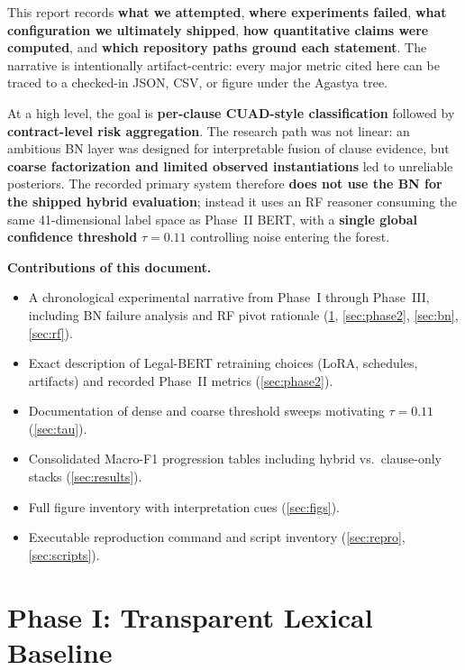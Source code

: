 \documentclass[conference,twocolumn]{IEEEtran}
\begin{document}
This report records \textbf{what we attempted}, \textbf{where experiments failed}, \textbf{what configuration we ultimately shipped}, \textbf{how quantitative claims were computed}, and \textbf{which repository paths ground each statement}. The narrative is intentionally artifact-centric: every major metric cited here can be traced to a checked-in JSON, CSV, or figure under the Agastya tree.

At a high level, the goal is \textbf{per-clause CUAD-style classification} followed by \textbf{contract-level risk aggregation}. The research path was not linear: an ambitious BN layer was designed for interpretable fusion of clause evidence, but \textbf{coarse factorization and limited observed instantiations} led to unreliable posteriors. The recorded primary system therefore \textbf{does not use the BN for the shipped hybrid evaluation}; instead it uses an RF reasoner consuming the same 41-dimensional label space as Phase~II BERT, with a \textbf{single global confidence threshold} $\tau = 0.11$ controlling noise entering the forest.

\textbf{Contributions of this document.}
\begin{itemize}
  \item A chronological experimental narrative from Phase~I through Phase~III, including BN failure analysis and RF pivot rationale (\ref{sec:phase1}, \ref{sec:phase2}, \ref{sec:bn}, \ref{sec:rf}).
  \item Exact description of Legal-BERT retraining choices (LoRA, schedules, artifacts) and recorded Phase~II metrics (\ref{sec:phase2}).
  \item Documentation of dense and coarse threshold sweeps motivating $\tau = 0.11$ (\ref{sec:tau}).
  \item Consolidated Macro-F1 progression tables including hybrid vs.\ clause-only stacks (\ref{sec:results}).
  \item Full figure inventory with interpretation cues (\ref{sec:figs}).
  \item Executable reproduction command and script inventory (\ref{sec:repro}, \ref{sec:scripts}).
\end{itemize}

\section{Phase I: Transparent Lexical Baseline}
\label{sec:phase1}
\end{document}
